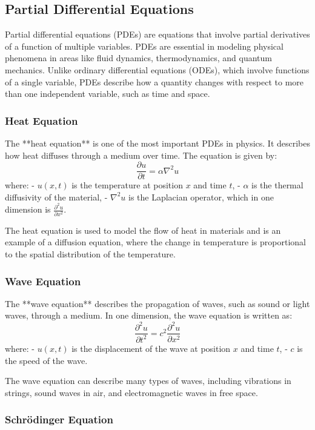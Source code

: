 \documentclass{article}
\begin{document}
\subsection{Partial Differential Equations}

Partial differential equations (PDEs) are equations that involve partial derivatives of a function of multiple variables. PDEs are essential in modeling physical phenomena in areas like fluid dynamics, thermodynamics, and quantum mechanics. Unlike ordinary differential equations (ODEs), which involve functions of a single variable, PDEs describe how a quantity changes with respect to more than one independent variable, such as time and space.

\subsubsection*{Heat Equation}

The **heat equation** is one of the most important PDEs in physics. It describes how heat diffuses through a medium over time. The equation is given by:
\[
\frac{\partial u}{\partial t} = \alpha \nabla^2 u
\]
where:
- \( u(x, t) \) is the temperature at position \( x \) and time \( t \),
- \( \alpha \) is the thermal diffusivity of the material,
- \( \nabla^2 u \) is the Laplacian operator, which in one dimension is \( \frac{\partial^2 u}{\partial x^2} \).

The heat equation is used to model the flow of heat in materials and is an example of a diffusion equation, where the change in temperature is proportional to the spatial distribution of the temperature.

\subsubsection*{Wave Equation}

The **wave equation** describes the propagation of waves, such as sound or light waves, through a medium. In one dimension, the wave equation is written as:
\[
\frac{\partial^2 u}{\partial t^2} = c^2 \frac{\partial^2 u}{\partial x^2}
\]
where:
- \( u(x, t) \) is the displacement of the wave at position \( x \) and time \( t \),
- \( c \) is the speed of the wave.

The wave equation can describe many types of waves, including vibrations in strings, sound waves in air, and electromagnetic waves in free space.

\subsubsection*{Schrödinger Equation}
\end{document}
